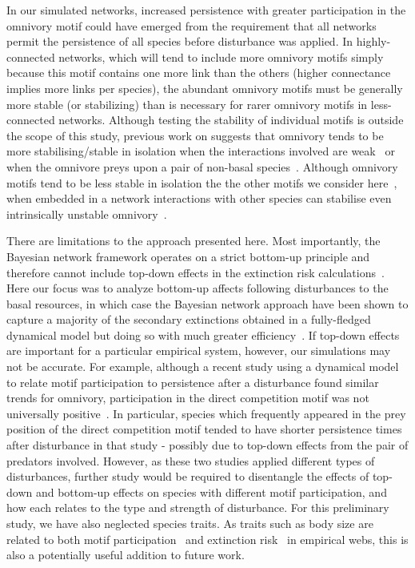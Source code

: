 \documentclass[12pt]{article}
\begin{document}
\begin{spacing}{2.0}
    
    In our simulated networks, increased persistence with greater participation in the omnivory motif could have emerged from the requirement that all networks permit the persistence of all species before disturbance was applied.
    In highly-connected networks, which will tend to include more omnivory motifs simply because this motif contains one more link than the others (higher connectance implies more links per species), the abundant omnivory motifs must be generally more stable (or stabilizing) than is necessary for rarer omnivory motifs in less-connected networks.
    Although testing the stability of individual motifs is outside the scope of this study, previous work on suggests that omnivory tends to be more stabilising/stable in isolation when the interactions involved are weak~\citep{Emmerson2004} or when the omnivore preys upon a pair of non-basal species~\citep{McLeod2021}.
    Although omnivory motifs tend to be less stable in isolation the the other motifs we consider here~\citep{Borrelli2015a}, when embedded in a network interactions with other species can stabilise even intrinsically unstable omnivory~\citep{Kratina2012}.
    
    

    There are limitations to the approach presented here.
    Most importantly, the Bayesian network framework operates on a strict bottom-up principle and therefore cannot include top-down effects in the extinction risk calculations~\citep{Eklof2013}. 
    Here our focus was to analyze bottom-up affects following disturbances to the basal resources, in which case the Bayesian network approach have been shown to capture a majority of the secondary extinctions obtained in a fully-fledged dynamical model but doing so with much greater efficiency~\citep{Eklof2013}.
    If top-down effects are important for a particular empirical system, however, our simulations may not be accurate. 
    For example, although a recent study using a dynamical model to relate motif participation to persistence after a disturbance found similar trends for omnivory, participation in the direct competition motif was not universally positive~\citep{Cirtwill2021_inprep}.
    In particular, species which frequently appeared in the prey position of the direct competition motif tended to have shorter persistence times after disturbance in that study - possibly due to top-down effects from the pair of predators involved.
    However, as these two studies applied different types of disturbances, further study would be required to disentangle the effects of top-down and bottom-up effects on species with different motif participation, and how each relates to the type and strength of disturbance.
    For this preliminary study, we have also neglected species traits.
    As traits such as body size are related to both motif participation~\citep{cirtwill2018feeding} and extinction risk~\citep{Brose2017, curtsdotter2011robustness, Cardillo2005, Purvis2000} in empirical webs, this is also a potentially useful addition to future work. 


\end{spacing}
\end{document}

